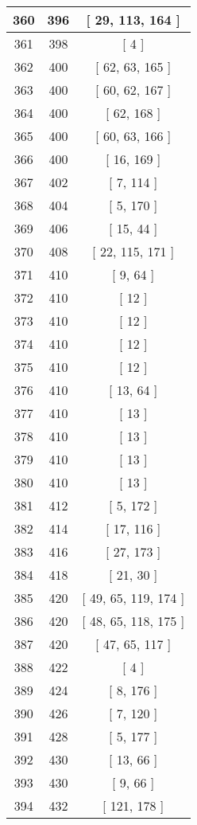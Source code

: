 \begin{center}
\begin{longtable}[H]{|| c c c ||}
\hline
360 & 396 & [ 29, 113, 164 ] \\ 
\hline
361 & 398 & [ 4 ] \\ 
\hline
362 & 400 & [ 62, 63, 165 ] \\ 
\hline
363 & 400 & [ 60, 62, 167 ] \\ 
\hline
364 & 400 & [ 62, 168 ] \\ 
\hline
365 & 400 & [ 60, 63, 166 ] \\ 
\hline
366 & 400 & [ 16, 169 ] \\ 
\hline
367 & 402 & [ 7, 114 ] \\ 
\hline
368 & 404 & [ 5, 170 ] \\ 
\hline
369 & 406 & [ 15, 44 ] \\ 
\hline
370 & 408 & [ 22, 115, 171 ] \\ 
\hline
371 & 410 & [ 9, 64 ] \\ 
\hline
372 & 410 & [ 12 ] \\ 
\hline
373 & 410 & [ 12 ] \\ 
\hline
374 & 410 & [ 12 ] \\ 
\hline
375 & 410 & [ 12 ] \\ 
\hline
376 & 410 & [ 13, 64 ] \\ 
\hline
377 & 410 & [ 13 ] \\ 
\hline
378 & 410 & [ 13 ] \\ 
\hline
379 & 410 & [ 13 ] \\ 
\hline
380 & 410 & [ 13 ] \\ 
\hline
381 & 412 & [ 5, 172 ] \\ 
\hline
382 & 414 & [ 17, 116 ] \\ 
\hline
383 & 416 & [ 27, 173 ] \\ 
\hline
384 & 418 & [ 21, 30 ] \\ 
\hline
385 & 420 & [ 49, 65, 119, 174 ] \\ 
\hline
386 & 420 & [ 48, 65, 118, 175 ] \\ 
\hline
387 & 420 & [ 47, 65, 117 ] \\ 
\hline
388 & 422 & [ 4 ] \\ 
\hline
389 & 424 & [ 8, 176 ] \\ 
\hline
390 & 426 & [ 7, 120 ] \\ 
\hline
391 & 428 & [ 5, 177 ] \\ 
\hline
392 & 430 & [ 13, 66 ] \\ 
\hline
393 & 430 & [ 9, 66 ] \\ 
\hline
394 & 432 & [ 121, 178 ] \\ 

\end{longtable}
\end{center}
